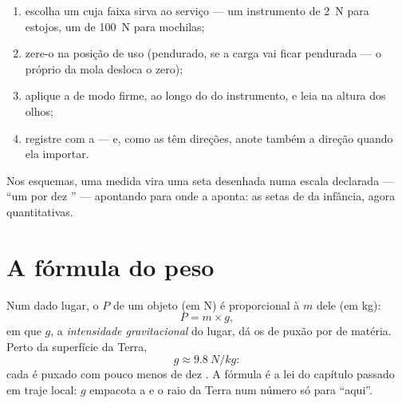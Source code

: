 \begin{method}\label{met:g9:weight-vs-mass:measure}
\begin{enumerate}
  \item escolha um  cuja faixa sirva ao serviço --- um
        instrumento de \qty{2}{N} para estojos, um de \qty{100}{N}
        para mochilas;
  \item zere-o na posição de uso (pendurado, se a carga vai ficar
        pendurada --- o próprio  da mola desloca o zero);
  \item aplique a  de modo firme, ao longo do  do
        instrumento, e leia na altura dos olhos;
  \item registre com a  --- e, como as  têm direções,
        anote também a direção quando ela importar.
\end{enumerate}
Nos esquemas, uma  medida vira uma seta desenhada numa escala
declarada --- ``um  por dez '' --- apontando para
onde a  aponta: as setas de  da infância, agora
quantitativas.
\end{method}

\section{A fórmula do peso}

\begin{proposition}\label{prop:g9:weight-vs-mass:formula}
Num dado lugar, o  $P$ de um objeto (em \unit{N}) é proporcional à
 $m$ dele (em \unit{kg}):
\[
P = m \times g ,
\]
em que $g$, a \emph{intensidade gravitacional} do lugar, dá os  de puxão por  de
matéria. Perto da superfície da Terra,
\[
g \approx \qty{9.8}{N/kg}:
\]
cada  é puxado com pouco menos de dez . A fórmula é
a lei do capítulo passado em traje local: $g$ empacota a  e o
raio da Terra num número só para ``aqui''.
\end{proposition}

